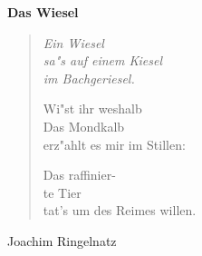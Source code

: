 \documentclass[12pt]{article}
\begin{document}
\begin{center}\Large\bfseries Das Wiesel \end{center}
\begin{verse}\itshape
Ein Wiesel\\ sa"s auf einem Kiesel\\ im Bachgeriesel.

Wi"st ihr weshalb\\ Das Mondkalb\\ erz"ahlt es mir im Stillen:

Das raffinier-\\ te Tier\\ tat's um des Reimes willen.
\end{verse}
\begin{flushright} Joachim Ringelnatz \end{flushright}
\end{document}
